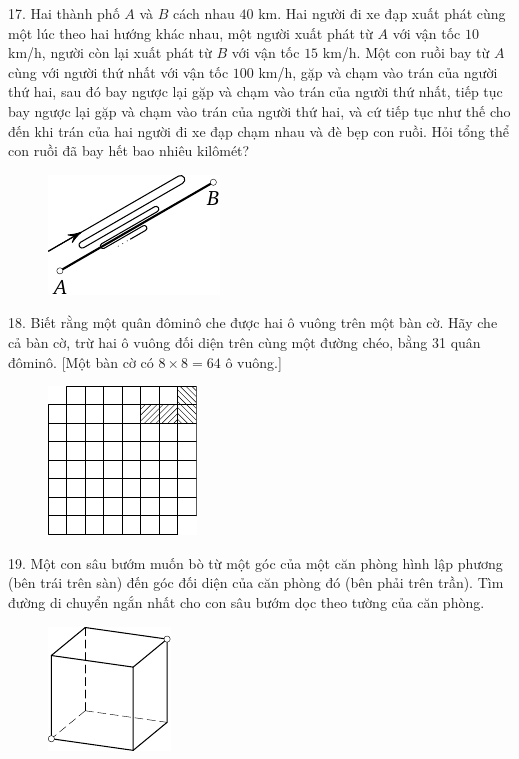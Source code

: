 \begin{problem}{17.}
	Hai thành phố $A$ và $B$ cách nhau $40$ km. Hai người đi xe đạp xuất phát cùng một lúc theo hai hướng khác nhau, một người xuất phát từ $A$ với vận tốc $10$ km/h, người còn lại xuất phát từ $B$ với vận tốc $15$ km/h. Một con ruồi bay từ $A$ cùng với người thứ nhất với vận tốc $100$ km/h, gặp và chạm vào trán của người thứ hai, sau đó bay ngược lại gặp  và chạm vào trán của người thứ nhất,  tiếp tục bay ngược lại gặp và chạm vào trán của người thứ hai, và cứ tiếp tục như thế cho đến khi trán của hai người đi xe đạp chạm nhau và đè bẹp con ruồi. Hỏi tổng thể con ruồi đã bay hết bao nhiêu kilômét?
	\begin{figure}
		\includegraphics{taskbook-1}
	\end{figure}
\end{problem}

\begin{problem}{18.}
	Biết rằng một quân đôminô che được hai ô vuông trên một bàn cờ. Hãy che cả bàn cờ, trừ hai ô vuông đối diện trên cùng một đường chéo, bằng 31 quân đôminô. [Một bàn cờ có $8\times 8 = 64$ ô vuông.]
	\begin{figure}
		\includegraphics{taskbook-2}
	\end{figure}
\end{problem}

\begin{problem}{19.}
	Một con sâu bướm muốn bò từ  một góc  của một căn phòng hình lập phương (bên trái trên sàn) đến góc đối diện của căn phòng đó  (bên phải trên trần).  Tìm đường di chuyển ngắn nhất cho con sâu bướm dọc theo tường của căn phòng.

	\begin{figure}
		\includegraphics{taskbook-3}
	\end{figure}
\end{problem}

